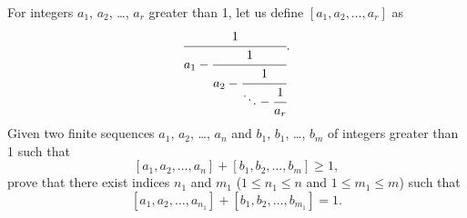 \problem{}
For integers $a_1$, $a_2$, \ldots, $a_r$ greater than 1, let us define
$[a_1, a_2, \ldots, a_r]$ as
\[
    \cfrac{1}{
        a_1 - \cfrac{1}{
            a_2 - \cfrac{1}{
                \ddots - \cfrac{1}{a_r} } } }
.\]
Given two finite sequences
$a_1$, $a_2$, \ldots, $a_n$ and $b_1$, $b_1$, \ldots, $b_m$
of integers greater than 1 such that
\[
    [a_1, a_2, \ldots, a_n] + [b_1, b_2, \ldots, b_m] \geq 1
,\]
prove that there exist indices $n_1$ and $m_1$ 
($1 \leq n_1 \leq n$ and $1 \leq m_1 \leq m$)
such that
\[
    [a_1, a_2, \ldots, a_{n_1}] + [b_1, b_2, \ldots, b_{m_1}] = 1
.\]
\solution
\endproblem
